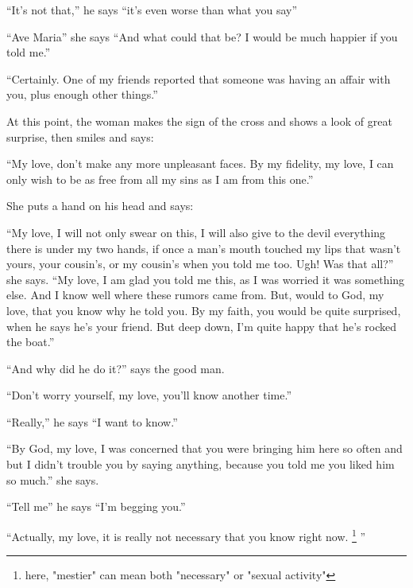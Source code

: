 \documentclass{book}
\begin{document}
``It's not that,'' he says ``it's even worse than what you say''

``Ave Maria'' she says ``And what could that be? I would be much happier if you told me.''

``Certainly. One of my friends reported that someone was having an affair with you, plus enough other things.''

At this point, the woman makes the sign of the cross and shows a look of great surprise, then smiles and says:

``My love, don't make any more unpleasant faces. By my fidelity, my love, I can only wish to be as free from all my sins as I am from this one.''

She puts a hand on his head and says:

``My love, I will not only swear on this, I will also give to the devil everything there is under my two hands, if once a man's mouth touched my lips that wasn't yours, your cousin's, or my cousin's when you told me too. Ugh! Was that all?'' she says. ``My love, I am glad you told me this, as I was worried it was something else. And I know well where these rumors came from. But, would to God, my love, that you know why he told you. By my faith, you would be quite surprised, when he says he's your friend. But deep down, I'm quite happy that he's rocked the boat.''

``And why did he do it?'' says the good man.

``Don't worry yourself, my love, you'll know another time.''

``Really,'' he says ``I want to know.''

``By God, my love, I was concerned that you were bringing him here so often and but I didn't trouble you by saying anything, because you told me you liked him so much.'' she says.

``Tell me'' he says ``I'm begging you.''

``Actually, my love, it is really not necessary that you know right now.
\footnote{here, "mestier" can mean both "necessary" or "sexual activity"}
''
\end{document}
